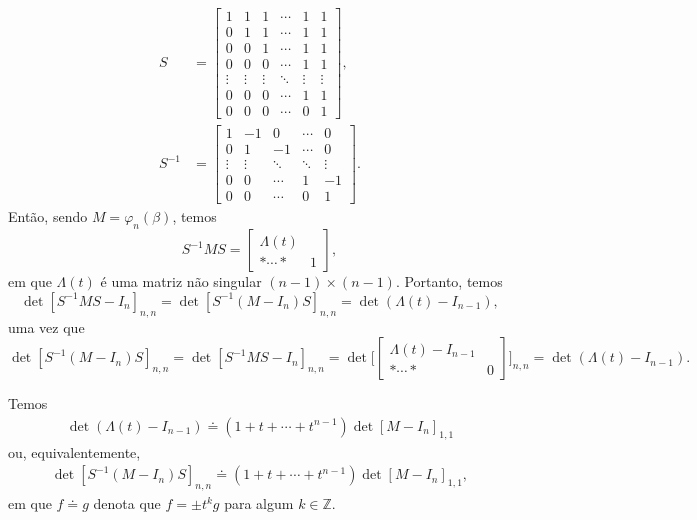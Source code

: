 	\begin{align*}
    	S &= \begin{bmatrix}
    	1 & 1 & 1 & \cdots & 1 & 1 \\
    	0 & 1 & 1 & \cdots & 1 & 1 \\
    	0 & 0 & 1 & \cdots & 1 & 1 \\
    	0 & 0 & 0 & \cdots & 1 & 1 \\
    	\vdots & \vdots & \vdots & \ddots & \vdots & \vdots \\
    	0 & 0 & 0 & \cdots & 1 & 1 \\
    	0 & 0 & 0 & \cdots & 0 & 1
    	\end{bmatrix}, \\
    	S^{-1} &= \begin{bmatrix}
    	1 & -1 & 0 & \cdots & 0\\
    	0 & 1  & -1 & \cdots & 0\\
    	\vdots & \vdots & \ddots & \ddots & \vdots \\
    	0 & 0 & \cdots & 1 & -1 \\
    	0 & 0 & \cdots & 0 & 1
    	\end{bmatrix}.
	\end{align*}
	Então, sendo $M = \varphi_n(\beta)$, temos
	\begin{equation*}
    	S^{-1}MS = \left[\begin{array}{c|c}
    	\Lambda(t) & \\
    	\hline 
    	\ast \cdots \ast & 1
    	\end{array}\right],
	\end{equation*}
	em que $\Lambda(t)$ é uma matriz não singular $(n-1)\times(n-1)$. Portanto, 
	temos 
	\[
	    \det[ S^{-1}MS - I_n]_{n,n} = \det[S^{-1}(M - I_n)S]_{n,n} = \det(\Lambda(t) - I_{n-1}),
	\]
	uma vez que
	\begin{equation*}
    	\det[S^{-1}(M - I_n)S]_{n,n} 
    	= \det[S^{-1}MS - I_n]_{n,n} 
    	= \det\Bigg[ \left[\begin{array}{c|c}
    	\Lambda(t) - I_{n-1} & \\
    	\hline
    	\ast\cdots\ast & 0
    	\end{array}\right]\Bigg]_{n,n} = \det(\Lambda(t) - I_{n-1}).
	\end{equation*}
	\begin{lemma}
	\label{lema Alexander}
		Temos
		\begin{align*}
		    \det(\Lambda(t) - I_{n-1}) \doteq(1+t+\cdots+t^{n-1})\det[M-I_n]_{1,1}
		\end{align*}
		ou, equivalentemente, 
		\begin{align*}
		    \det[S^{-1}(M - I_{n})S]_{n,n} \doteq(1+t+\cdots+t^{n-1})\det[M-I_n]_{1,1},
		\end{align*}
		em que $f\doteq g$ denota que $f = \pm t^kg$ para algum $k\in\mathbb{Z}$.
	\end{lemma}
